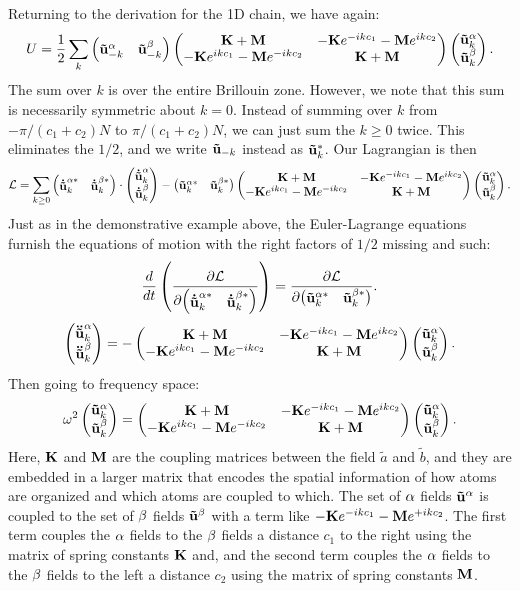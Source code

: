 \documentclass[12pt]{article}
\begin{document}
Returning to the derivation for the 1D chain, we have again:
\[ U = \frac{1}{2} \sum_k \left(\begin{matrix} \mathbf{\tilde u}^\alpha_{-k} & \mathbf{\tilde u}^\beta_{-k}\end{matrix}\right) 
\left(\begin{matrix} \mathbf{K} + \mathbf{M} & - \mathbf{K} e^{-ikc_1} - \mathbf{M}e^{ikc_2} \\ - \mathbf{K}e^{ikc_1} - \mathbf{M}e^{-ikc_2} & 
\mathbf{K}+\mathbf{M}\end{matrix}\right) \left(\begin{matrix} \mathbf{\tilde u}^\alpha_k \\ \mathbf{\tilde u}^\beta_k \end{matrix}\right).\]
The sum over $k$ is over the entire Brillouin zone. However, we note that this 
sum is necessarily symmetric about $k=0$. Instead of summing over $k$ from 
$-\pi/(c_1+c_2)N$ to $\pi/(c_1+c_2)N$, we can just sum the $k\geq0$ twice. This 
eliminates the $1/2$, and we write $\mathbf{\tilde u}_{-k}$ instead as $\mathbf{\tilde
u}_{k}^*$. Our Lagrangian is then
\[ \mathcal{L} = \sum_{k\geq 0} \left(\begin{matrix} \mathbf{\dot{\tilde u}}^{\alpha *}_{k} & 
\mathbf{\dot{\tilde u}}^{\beta *}_{k}\end{matrix}\right) \cdot \left(\begin{matrix} \mathbf{\dot{\tilde u}}^\alpha_k \\ 
\mathbf{\dot{\tilde u}}^\beta_k \end{matrix}\right) - 
\left(\begin{matrix} \mathbf{\tilde u}^{\alpha *}_{k} & \mathbf{\tilde 
u}^{\beta *}_{k}\end{matrix}\right) \left(\begin{matrix} \mathbf{K} + \mathbf{M} & - \mathbf{K} e^{-ikc_1} - \mathbf{M}e^{ikc_2} \\ - \mathbf{K}e^{ikc_1} - 
\mathbf{M}e^{-ikc_2} & \mathbf{K}+\mathbf{M}\end{matrix}\right) \left(\begin{matrix} \mathbf{\tilde u}^\alpha_k \\ \mathbf{\tilde 
u}^\beta_k \end{matrix}\right).\]
Just as in the demonstrative example above, the Euler-Lagrange equations 
furnish the equations of motion with the right factors of $1/2$ missing and 
such:
\[ \frac{d {}}{d {t}} \left( \frac{\partial {\mathcal{L}}}{\partial {\left(\begin{matrix} \mathbf{\dot{\tilde u}}^{\alpha*}_{k} 
& 
\mathbf{\dot{\tilde u}}^{\beta*}_{k}\end{matrix}\right) }} \right) = \frac{\partial {\mathcal{L}}}{\partial { \left(\begin{matrix} \mathbf{\tilde 
u}^{\alpha*}_{k} & \mathbf{\tilde 
u}^{\beta*}_{k}\end{matrix}\right) }}.\]
\[ \left(\begin{matrix} \mathbf{\ddot{\tilde u}}^\alpha_k \\ \mathbf{\ddot{\tilde u}}^\beta_k \end{matrix}\right) = -\left(\begin{matrix} 
\mathbf{K} + \mathbf{M} & - \mathbf{K} e^{-ikc_1} - \mathbf{M}e^{ikc_2} \\ - \mathbf{K}e^{ikc_1} - 
\mathbf{M}e^{-ikc_2} & \mathbf{K}+\mathbf{M}\end{matrix}\right) \left(\begin{matrix} \mathbf{\tilde u}^\alpha_k \\ \mathbf{\tilde u}^\beta_k \end{matrix}\right).\]
Then going to frequency space:
\[ \omega^2 \left(\begin{matrix} \mathbf{\tilde u}^\alpha_k \\ \mathbf{\tilde u}^\beta_k \end{matrix}\right) = 
\left(\begin{matrix} 
\mathbf{K} + \mathbf{M} & - \mathbf{K} e^{-ikc_1} - \mathbf{M}e^{ikc_2} \\ - \mathbf{K}e^{ikc_1} - 
\mathbf{M}e^{-ikc_2} & \mathbf{K}+\mathbf{M}\end{matrix}\right) \left(\begin{matrix} \mathbf{\tilde u}^\alpha_k \\ \mathbf{\tilde u}^\beta_k \end{matrix}\right).\]
Here, $\mathbf{K}$ and $\mathbf{M}$ are the coupling matrices between the field $\tilde a$ and 
$\tilde b$, and they are embedded in a larger matrix that encodes the spatial 
information of how atoms are organized and which atoms are coupled to which. 
The set of $\alpha$ fields $\mathbf{\tilde u}^\alpha$ is coupled to the set of $\beta$ 
fields $\mathbf{\tilde u}^\beta$ with a term like $-\mathbf{K} e^{-ikc_1} -\mathbf{M} e^{+ikc_2}$. 
The first term couples the $\alpha$ fields to the $\beta$ fields a 
distance $c_1$ to the right using the matrix of spring constants $\mathbf{K}$ and, and 
the second term couples the $\alpha$ fields to the $\beta$ fields to the left a 
distance $c_2$ using the matrix of spring constants $\mathbf{M}$.
\end{document}
